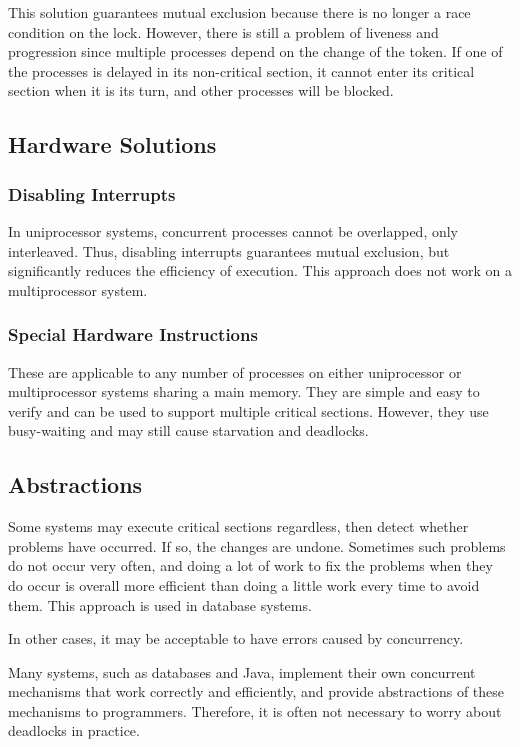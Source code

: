 This solution guarantees mutual exclusion because there is no longer a race condition on the lock.
However, there is still a problem of liveness and progression since multiple processes depend on the change of the token.
If one of the processes is delayed in its non-critical section, it cannot enter its critical section when it is its turn, and other processes will be blocked.

\subsection{Hardware Solutions}
\subsubsection{Disabling Interrupts}

In uniprocessor systems, concurrent processes cannot be overlapped, only interleaved.
Thus, disabling interrupts guarantees mutual exclusion, but significantly reduces the efficiency of execution.
This approach does not work on a multiprocessor system.

\subsubsection{Special Hardware Instructions}

These are applicable to any number of processes on either uniprocessor or multiprocessor systems sharing a main memory.
They are simple and easy to verify and can be used to support multiple critical sections.
However, they use busy-waiting and may still cause starvation and deadlocks.

\subsection{Abstractions}

Some systems may execute critical sections regardless, then detect whether problems have occurred.
If so, the changes are undone.
Sometimes such problems do not occur very often, and doing a lot of work to fix the problems when they do occur is overall more efficient than doing a little work every time to avoid them.
This approach is used in database systems.

In other cases, it may be acceptable to have errors caused by concurrency.

Many systems, such as databases and Java, implement their own concurrent mechanisms that work correctly and efficiently, and provide abstractions of these mechanisms to programmers.
Therefore, it is often not necessary to worry about deadlocks in practice.
